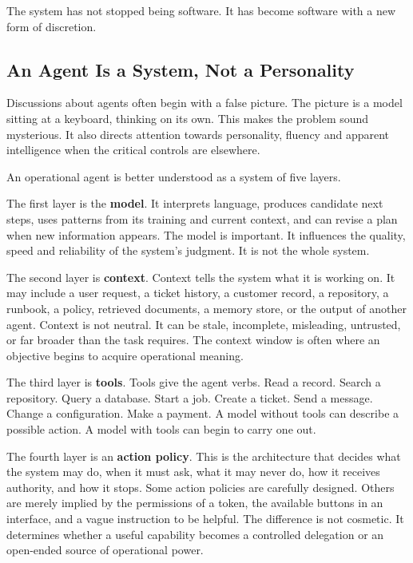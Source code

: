 The system has not stopped being software. It has become software with a
new form of discretion.

\subsection{An Agent Is a System, Not a
Personality}\label{an-agent-is-a-system-not-a-personality}

Discussions about agents often begin with a false picture. The picture
is a model sitting at a keyboard, thinking on its own. This makes the
problem sound mysterious. It also directs attention towards personality,
fluency and apparent intelligence when the critical controls are
elsewhere.

An operational agent is better understood as a system of five layers.

The first layer is the \textbf{model}. It interprets language, produces
candidate next steps, uses patterns from its training and current
context, and can revise a plan when new information appears. The model
is important. It influences the quality, speed and reliability of the
system's judgment. It is not the whole system.

The second layer is \textbf{context}. Context tells the system what it
is working on. It may include a user request, a ticket history, a
customer record, a repository, a runbook, a policy, retrieved documents,
a memory store, or the output of another agent. Context is not neutral.
It can be stale, incomplete, misleading, untrusted, or far broader than
the task requires. The context window is often where an objective begins
to acquire operational meaning.

The third layer is \textbf{tools}. Tools give the agent verbs. Read a
record. Search a repository. Query a database. Start a job. Create a
ticket. Send a message. Change a configuration. Make a payment. A model
without tools can describe a possible action. A model with tools can
begin to carry one out.

The fourth layer is an \textbf{action policy}. This is the architecture
that decides what the system may do, when it must ask, what it may never
do, how it receives authority, and how it stops. Some action policies
are carefully designed. Others are merely implied by the permissions of
a token, the available buttons in an interface, and a vague instruction
to be helpful. The difference is not cosmetic. It determines whether a
useful capability becomes a controlled delegation or an open-ended
source of operational power.


